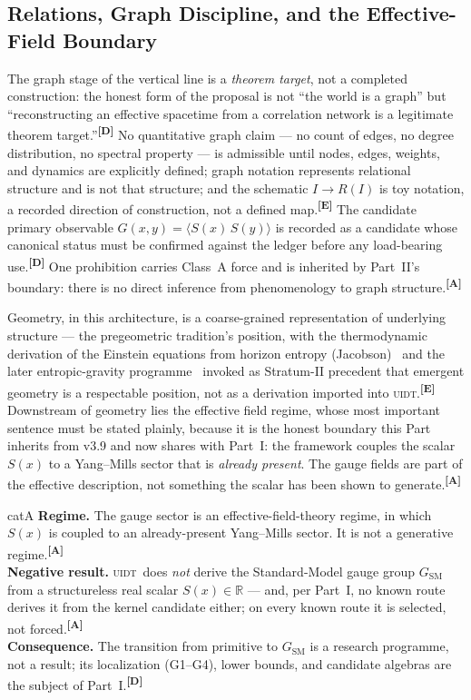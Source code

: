 \documentclass[12pt,a4paper,twoside]{article}
\theoremstyle{plain}
\theoremstyle{definition}
\theoremstyle{remark}
\newcommand{\UIDT}{\textsc{uidt}}
\newcommand{\catmark}[1]{\textsuperscript{\textsf{\textbf{[#1]}}}}
\begin{document}
\subsection{Relations, Graph Discipline, and the Effective-Field Boundary}
\label{subsec:coarse-geometry-eft}

The graph stage of the vertical line is a \emph{theorem target}, not a
completed construction: the honest form of the proposal is not ``the
world is a graph'' but ``reconstructing an effective spacetime from a
correlation network is a legitimate theorem target.''\catmark{D} No
quantitative graph claim --- no count of edges, no degree distribution,
no spectral property --- is admissible until nodes, edges, weights, and
dynamics are explicitly defined; graph notation represents relational
structure and is not that structure; and the schematic $I \to R(I)$ is
toy notation, a recorded direction of construction, not a defined
map.\catmark{E} The candidate primary observable
$G(x,y) = \langle S(x)\,S(y)\rangle$ is recorded as a candidate whose
canonical status must be confirmed against the ledger before any
load-bearing use.\catmark{D} One prohibition carries Class~A force and
is inherited by Part~II's boundary: there is no direct inference from
phenomenology to graph structure.\catmark{A}

Geometry, in this architecture, is a coarse-grained representation of
underlying structure --- the pregeometric tradition's position, with the
thermodynamic derivation of the Einstein equations from horizon entropy
(Jacobson)~\cite{jacobson1995} and the later entropic-gravity programme~\cite{padmanabhan2010,verlinde2011,chirco2014} invoked as
Stratum-II precedent that emergent geometry is a respectable position,
not as a derivation imported into \UIDT.\catmark{E} Downstream of
geometry lies the effective field regime, whose most important sentence
must be stated plainly, because it is the honest boundary this Part
inherits from v3.9 and now shares with Part~I: the framework couples the
scalar $S(x)$ to a Yang--Mills sector that is \emph{already present}.
The gauge fields are part of the effective description, not something
the scalar has been shown to generate.\catmark{A}

\begin{evidencebox}{catA}
\textbf{Regime.} The gauge sector is an effective-field-theory regime,
in which $S(x)$ is coupled to an already-present Yang--Mills sector. It
is not a generative regime.\catmark{A}\\[0.3em]
\textbf{Negative result.} \UIDT\ does \emph{not} derive the
Standard-Model gauge group $G_{\mathrm{SM}}$ from a structureless real
scalar $S(x)\in\mathbb{R}$ --- and, per Part~I, no known route derives
it from the kernel candidate either; on every known route it is
selected, not forced.\catmark{A}\\[0.3em]
\textbf{Consequence.} The transition from primitive to
$G_{\mathrm{SM}}$ is a research programme, not a result; its
localization (G1--G4), lower bounds, and candidate algebras are the
subject of Part~I.\catmark{D}
\end{evidencebox}
\end{document}
